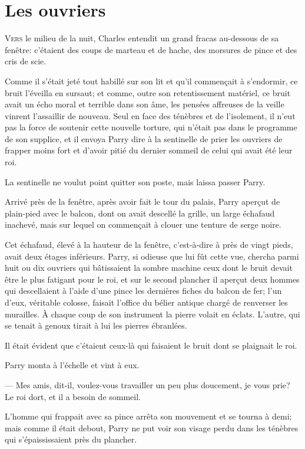 \chapter{Les ouvriers}

\lettrine{V}{ers} le milieu de la nuit, Charles entendit un grand fracas au-dessous de sa fenêtre: c'étaient des coups de marteau et de hache, des morsures de pince et des cris de scie.

\zz
Comme il s'était jeté tout habillé sur son lit et qu'il commençait à s'endormir, ce bruit l'éveilla en sursaut; et comme, outre son retentissement matériel, ce bruit avait un écho moral et terrible dans son âme, les pensées affreuses de la veille vinrent l'assaillir de nouveau. Seul en face des ténèbres et de l'isolement, il n'eut pas la force de soutenir cette nouvelle torture, qui n'était pas dans le programme de son supplice, et il envoya Parry dire à la sentinelle de prier les ouvriers de frapper moins fort et d'avoir pitié du dernier sommeil de celui qui avait été leur roi.

La sentinelle ne voulut point quitter son poste, mais laissa passer Parry.

Arrivé près de la fenêtre, après avoir fait le tour du palais, Parry aperçut de plain-pied avec le balcon, dont on avait descellé la grille, un large échafaud inachevé, mais sur lequel on commençait à clouer une tenture de serge noire.

Cet échafaud, élevé à la hauteur de la fenêtre, c'est-à-dire à près de vingt pieds, avait deux étages inférieurs. Parry, si odieuse que lui fût cette vue, chercha parmi huit ou dix ouvriers qui bâtissaient la sombre machine ceux dont le bruit devait être le plus fatigant pour le roi, et sur le second plancher il aperçut deux hommes qui descellaient à l'aide d'une pince les dernières fiches du balcon de fer; l'un d'eux, véritable colosse, faisait l'office du bélier antique chargé de renverser les murailles. À chaque coup de son instrument la pierre volait en éclats. L'autre, qui se tenait à genoux tirait à lui les pierres ébranlées.

Il était évident que c'étaient ceux-là qui faisaient le bruit dont se plaignait le roi.

Parry monta à l'échelle et vint à eux.

— Mes amis, dit-il, voulez-vous travailler un peu plus doucement, je vous prie? Le roi dort, et il a besoin de sommeil.

L'homme qui frappait avec sa pince arrêta son mouvement et se tourna à demi; mais comme il était debout, Parry ne put voir son visage perdu dans les ténèbres qui s'épaississaient près du plancher.

